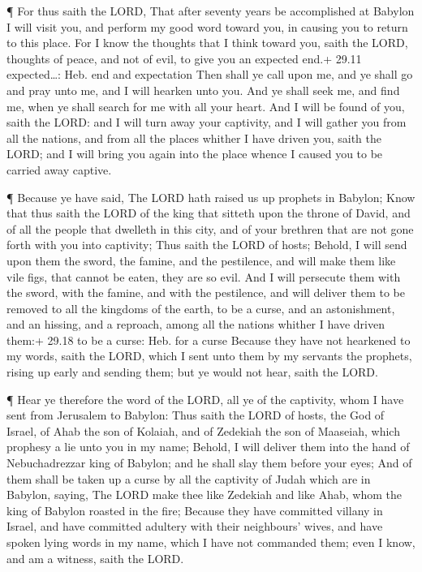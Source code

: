  ¶ For thus saith the LORD, That after seventy years be
accomplished at Babylon I will visit you, and perform my good word
toward you, in causing you to return to this place.  For I
know the thoughts that I think toward you, saith the LORD, thoughts of
peace, and not of evil, to give you an expected end.+ 29.11
expected\ldots: Heb. end and expectation  Then shall ye
call upon me, and ye shall go and pray unto me, and I will hearken unto
you.  And ye shall seek me, and find me, when ye shall
search for me with all your heart.  And I will be found of
you, saith the LORD: and I will turn away your captivity, and I will
gather you from all the nations, and from all the places whither I have
driven you, saith the LORD; and I will bring you again into the place
whence I caused you to be carried away captive.

 ¶ Because ye have said, The LORD hath raised us up
prophets in Babylon;  Know that thus saith the LORD of the
king that sitteth upon the throne of David, and of all the people that
dwelleth in this city, and of your brethren that are not gone forth with
you into captivity;  Thus saith the LORD of hosts; Behold,
I will send upon them the sword, the famine, and the pestilence, and
will make them like vile figs, that cannot be eaten, they are so evil.
 And I will persecute them with the sword, with the famine,
and with the pestilence, and will deliver them to be removed to all the
kingdoms of the earth, to be a curse, and an astonishment, and an
hissing, and a reproach, among all the nations whither I have driven
them:+ 29.18 to be a curse: Heb. for a curse  Because they
have not hearkened to my words, saith the LORD, which I sent unto them
by my servants the prophets, rising up early and sending them; but ye
would not hear, saith the LORD.

 ¶ Hear ye therefore the word of the LORD, all ye of the
captivity, whom I have sent from Jerusalem to Babylon: 
Thus saith the LORD of hosts, the God of Israel, of Ahab the son of
Kolaiah, and of Zedekiah the son of Maaseiah, which prophesy a lie unto
you in my name; Behold, I will deliver them into the hand of
Nebuchadrezzar king of Babylon; and he shall slay them before your eyes;
 And of them shall be taken up a curse by all the captivity
of Judah which are in Babylon, saying, The LORD make thee like Zedekiah
and like Ahab, whom the king of Babylon roasted in the fire;
 Because they have committed villany in Israel, and have
committed adultery with their neighbours' wives, and have spoken lying
words in my name, which I have not commanded them; even I know, and am a
witness, saith the LORD.

